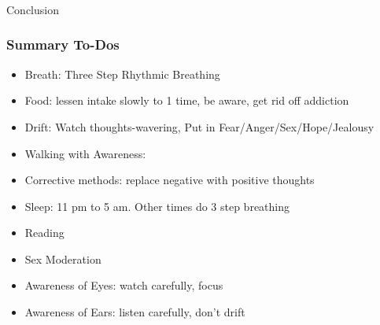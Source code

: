 \begin{frame}[fragile]\frametitle{}
\begin{center}
{\Large Conclusion}
\end{center}
\end{frame}



\begin{frame}[fragile]
\frametitle{Summary To-Dos}
\begin{itemize}
\item Breath: Three Step Rhythmic Breathing
\item Food: lessen intake slowly to 1 time, be aware, get rid off addiction
\item Drift: Watch thoughts-wavering, Put in Fear/Anger/Sex/Hope/Jealousy
\item Walking with Awareness: 
\item Corrective methods: replace negative with positive thoughts
\item Sleep: 11 pm to 5 am. Other times do 3 step breathing
\item Reading
\item Sex Moderation
\item Awareness of Eyes: watch carefully, focus
\item Awareness of Ears: listen carefully, don't drift
\end{itemize}
\end{frame}